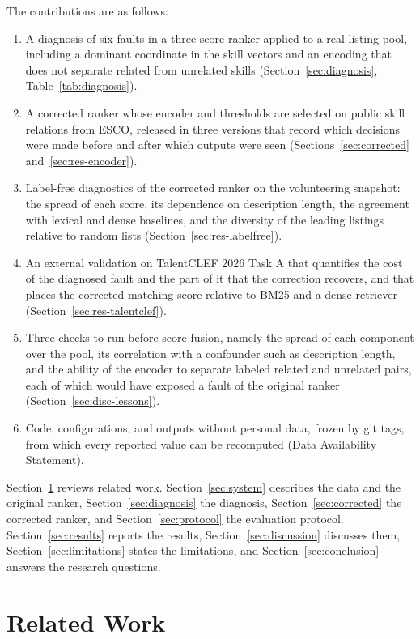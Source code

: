 \documentclass[CHICAGO]{USG}
\begin{document}
The contributions are as follows:
\begin{enumerate}
\item A diagnosis of six faults in a three-score ranker applied to a real listing pool, including a dominant coordinate in the skill vectors and an encoding that does not separate related from unrelated skills (Section~\ref{sec:diagnosis}, Table~\ref{tab:diagnosis}).
\item A corrected ranker whose encoder and thresholds are selected on public skill relations from ESCO, released in three versions that record which decisions were made before and after which outputs were seen (Sections~\ref{sec:corrected} and~\ref{sec:res-encoder}).
\item Label-free diagnostics of the corrected ranker on the volunteering snapshot: the spread of each score, its dependence on description length, the agreement with lexical and dense baselines, and the diversity of the leading listings relative to random lists (Section~\ref{sec:res-labelfree}).
\item An external validation on TalentCLEF 2026 Task A that quantifies the cost of the diagnosed fault and the part of it that the correction recovers, and that places the corrected matching score relative to BM25 and a dense retriever (Section~\ref{sec:res-talentclef}).
\item Three checks to run before score fusion, namely the spread of each component over the pool, its correlation with a confounder such as description length, and the ability of the encoder to separate labeled related and unrelated pairs, each of which would have exposed a fault of the original ranker (Section~\ref{sec:disc-lessons}).
\item Code, configurations, and outputs without personal data, frozen by git tags, from which every reported value can be recomputed (Data Availability Statement).
\end{enumerate}

Section~\ref{sec:related} reviews related work. Section~\ref{sec:system} describes the data and the original ranker, Section~\ref{sec:diagnosis} the diagnosis, Section~\ref{sec:corrected} the corrected ranker, and Section~\ref{sec:protocol} the evaluation protocol. Section~\ref{sec:results} reports the results, Section~\ref{sec:discussion} discusses them, Section~\ref{sec:limitations} states the limitations, and Section~\ref{sec:conclusion} answers the research questions.

\section{Related Work}
\label{sec:related}
\end{document}

